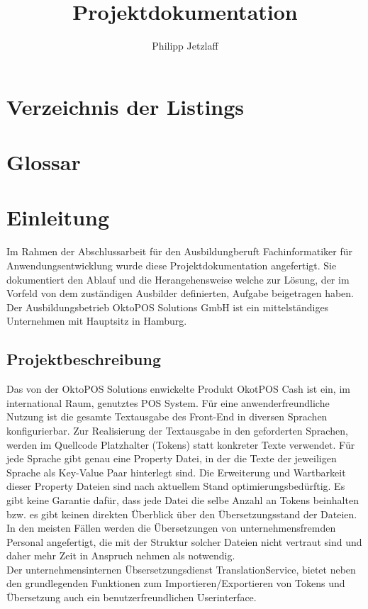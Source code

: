 \documentclass[oneside]{article}
\author{Philipp Jetzlaff}
\title{Projektdokumentation}
\renewcommand{\listfigurename}{Abbildungsverzeichnis}
\begin{document}
  \pagestyle{fancy}
  
  \tableofcontents
  \addcontentsline{toc}{section}{\listfigurename}
  \listoffigures
  \listoftables
  \newpage
  \section{Verzeichnis der Listings}
  \newpage
  \section{Glossar}
  \newpage
  \section{Einleitung}
    Im Rahmen der Abschlussarbeit für den Ausbildungberuft Fachinformatiker für Anwendungsentwicklung 
    wurde diese Projektdokumentation angefertigt. Sie dokumentiert den Ablauf und die Herangehensweise 
    welche zur Lösung, der im Vorfeld von dem zuständigen Ausbilder definierten, Aufgabe beigetragen haben. 
    Der Ausbildungsbetrieb OktoPOS Solutions GmbH ist ein mittelständiges Unternehmen mit Hauptsitz in Hamburg.
  \subsection{Projektbeschreibung}
    Das von der OktoPOS Solutions enwickelte Produkt OkotPOS Cash ist ein, im international Raum, genutztes POS System. 
    Für eine anwenderfreundliche Nutzung ist die gesamte Textausgabe des Front-End in diversen Sprachen konfigurierbar. Zur Realisierung der Textausgabe in 
    den geforderten Sprachen, werden im Quellcode Platzhalter (Tokens) statt konkreter Texte verwendet. 
    Für jede Sprache gibt genau eine Property Datei, in der die Texte der jeweiligen Sprache als Key-Value Paar hinterlegt sind.
    Die Erweiterung und Wartbarkeit dieser Property Dateien sind nach aktuellem Stand optimierungsbedürftig. 
    Es gibt keine Garantie dafür, dass jede Datei die selbe Anzahl an Tokens beinhalten bzw. es gibt keinen direkten Überblick über den Übersetzungsstand der Dateien. 
    In den meisten Fällen werden die Übersetzungen von unternehmensfremden Personal angefertigt, die mit der Struktur solcher Dateien nicht vertraut sind und daher mehr Zeit in Anspruch nehmen als notwendig.\\
    Der unternehmensinternen Übsersetzungsdienst TranslationService, bietet neben den grundlegenden Funktionen zum Importieren/Exportieren von Tokens und Übersetzung auch ein benutzerfreundlichen Userinterface.
\end{document}
